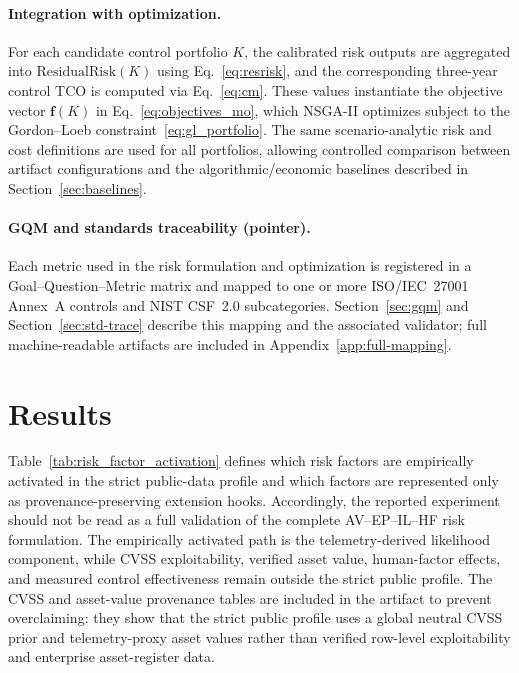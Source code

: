 \documentclass[preprint,12pt]{elsarticle}
\begin{document}
\paragraph{Integration with optimization.}
For each candidate control portfolio $K$, the calibrated risk outputs are aggregated into $\mathrm{ResidualRisk}(K)$ using Eq.~\eqref{eq:resrisk}, and the corresponding three-year control TCO is computed via Eq.~\eqref{eq:cm}. These values instantiate the objective vector $\mathbf{f}(K)$ in Eq.~\eqref{eq:objectives_mo}, which NSGA-II optimizes subject to the Gordon--Loeb constraint~\eqref{eq:gl_portfolio}. The same scenario-analytic risk and cost definitions are used for all portfolios, allowing controlled comparison between artifact configurations and the algorithmic/economic baselines described in Section~\ref{sec:baselines}.

\paragraph{GQM and standards traceability (pointer).}
Each metric used in the risk formulation and optimization is registered in a Goal--Question--Metric matrix and mapped to one or more ISO/IEC~27001 Annex~A controls and NIST CSF~2.0 subcategories. Section~\ref{sec:gqm} and Section~\ref{sec:std-trace} describe this mapping and the associated validator; full machine-readable artifacts are included in Appendix~\ref{app:full-mapping}.

\section{Results}
\label{sec:results}

Table~\ref{tab:risk_factor_activation} defines which risk factors are empirically activated in the strict public-data profile and which factors are represented only as provenance-preserving extension hooks. Accordingly, the reported experiment should not be read as a full validation of the complete AV--EP--IL--HF risk formulation. The empirically activated path is the telemetry-derived likelihood component, while CVSS exploitability, verified asset value, human-factor effects, and measured control effectiveness remain outside the strict public profile. The CVSS and asset-value provenance tables are included in the artifact to prevent overclaiming: they show that the strict public profile uses a global neutral CVSS prior and telemetry-proxy asset values rather than verified row-level exploitability and enterprise asset-register data.
\end{document}
